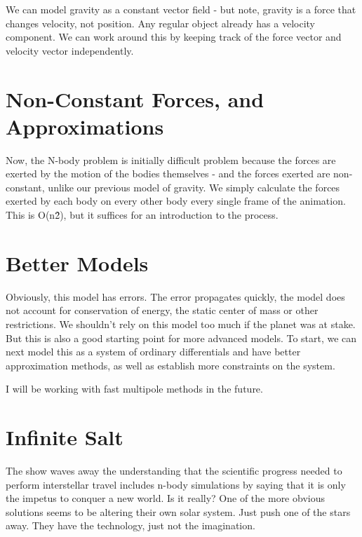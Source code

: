 \documentclass[11pt]{article} %
\begin{document}
We can model gravity as a constant vector field - but note, gravity is a force that changes velocity, not position. Any regular object already has a velocity component. We can work around this by keeping track of the force vector and velocity vector independently.


\section{Non-Constant Forces, and Approximations}
Now, the N-body problem is initially difficult problem because the forces are exerted by the motion of the bodies themselves - and the forces exerted are non-constant, unlike our previous model of gravity. We simply calculate the forces exerted by each body on every other body every single frame of the animation. This is O(n\^2), but it suffices for an introduction to the process.

\section{Better Models}
Obviously, this model has errors. The error propagates quickly, the model does not account for conservation of energy, the static center of mass or other restrictions. We shouldn't rely on this model too much if the planet was at stake. But this is also a good starting point for more advanced models. To start, we can next model this as a system of ordinary differentials and have better approximation methods, as well as establish more constraints on the system.

I will be working with fast multipole methods in the future.

\section{Infinite Salt}

The show waves away the understanding that the scientific progress needed to perform interstellar travel includes n-body simulations by saying that it is only the impetus to conquer a new world. Is it really? One of the more obvious solutions seems to be altering their own solar system. Just push one of the stars away. They have the technology, just not the imagination.
\end{document}
